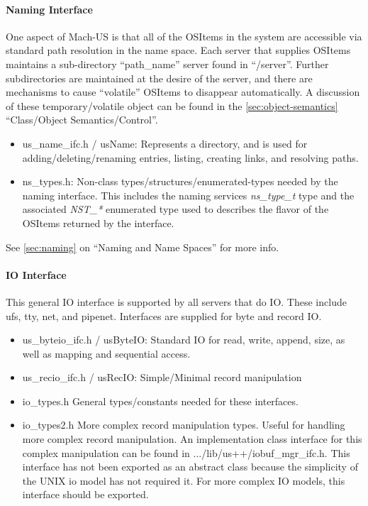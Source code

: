 \paragraph{Naming Interface}
One aspect of Mach-US is that all of the OSItems in the system are
accessible via standard path resolution in the name space.  Each server
that supplies OSItems
maintains a sub-directory ``path\_name'' server found in ``/server''.
Further subdirectories are maintained at the desire of the server, and
there are mechanisms to cause ``volatile'' OSItems to disappear
automatically.  A discussion of these temporary/volatile object
can be found in the {\SECREF} \ref{sec:object-semantics}
``Class/Object Semantics/Control''.
\begin{itemize}
\item{us\_name\_ifc.h / usName}: Represents a directory, and is used
for adding/deleting/renaming entries, listing, creating links, and
resolving paths.
\item{ns\_types.h}: Non-class types/structures/enumerated-types
needed by the naming interface.  This includes the naming services
{\em ns\_type\_t} type and the associated {\em NST\_*} enumerated type used
to describes the flavor of the OSItems returned by the interface.
\end{itemize}
See {\SECREF} \ref{sec:naming} on ``Naming and Name Spaces'' for more info.

\paragraph{IO Interface}
This general IO interface is supported by all servers that do IO.  
These include ufs, tty, net, and pipenet.  Interfaces
are supplied for byte and record IO.
\begin{itemize}

\item{us\_byteio\_ifc.h / usByteIO}: Standard IO for read, write, append, size,
as well as mapping and sequential access.
\item{us\_recio\_ifc.h / usRecIO}: Simple/Minimal record manipulation
\item{io\_types.h} General types/constants needed for these interfaces.
\item{io\_types2.h} More complex record manipulation types.  Useful for
handling more complex record manipulation.  An implementation class interface
for this complex manipulation can be found in 
.../lib/us++/iobuf\_mgr\_ifc.h.  This interface has not been exported
as an abstract class because the simplicity of the UNIX io model has not
required it.  For more complex IO models, this interface should be exported.
\end{itemize}

